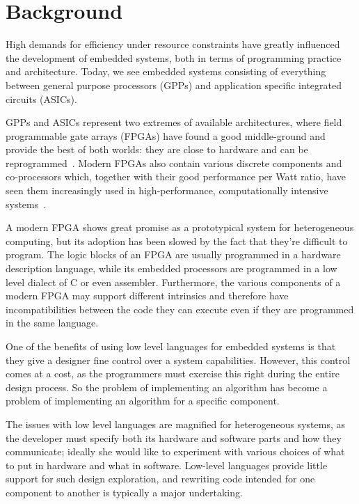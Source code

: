 \documentclass[../paper.tex]{subfiles}
\begin{document}
\chapter{Background}
\label{background}

High demands for efficiency under resource constraints have greatly influenced the development of embedded systems, both in terms of programming practice and architecture. Today, we see embedded systems consisting of everything between general purpose processors (GPPs) and application specific integrated circuits (ASICs).

GPPs and ASICs represent two extremes of available architectures, where field programmable gate arrays (FPGAs) have found a good middle-ground and provide the best of both worlds: they are close to hardware and can be reprogrammed~\cite{bacon2013}. Modern FPGAs also contain various discrete components and co-processors which, together with their good performance per Watt ratio, have seen them increasingly used in high-performance, computationally intensive systems~\cite{mcmillan2014}.

A modern FPGA shows great promise as a prototypical system for heterogeneous computing, but its adoption has been slowed by the fact that they're difficult to program. The logic blocks of an FPGA are usually programmed in a hardware description language, while its embedded processors are programmed in a low level dialect of C or even assembler. Furthermore, the various components of a modern FPGA may support different intrinsics and therefore have incompatibilities between the code they can execute even if they are programmed in the same language.

One of the benefits of using low level languages for embedded systems is that they give a designer fine control over a system capabilities. However, this control comes at a cost, as the programmers must exercise this right during the entire design process. So the problem of implementing an algorithm has become a problem of implementing an algorithm for a specific component.

The issues with low level languages are magnified for heterogeneous systems, as the developer must specify both its hardware and software parts and how they communicate; ideally she would like to experiment with various choices of what to put in hardware and what in software. Low-level languages provide little support for such design exploration, and rewriting code intended for one component to another is typically a major undertaking.
\end{document}
